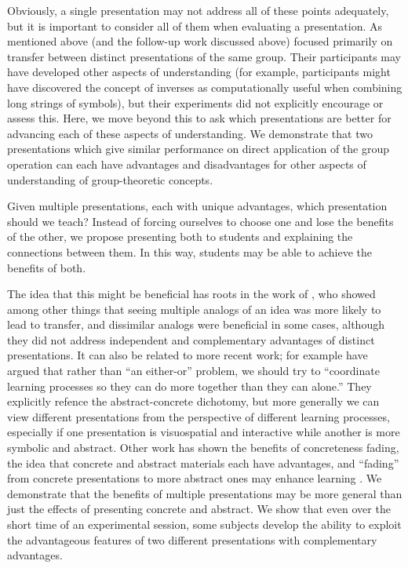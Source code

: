 \documentclass[man,mask,10pt]{apa6}
\begin{document}
Obviously, a single presentation may not address all of these points adequately, but it is important to consider all of them when evaluating a presentation. As mentioned above  (and the follow-up work discussed above) focused primarily on transfer between distinct presentations of the same group. Their participants may have developed other aspects of understanding (for example, participants might have discovered the concept of inverses as computationally useful when combining long strings of symbols), but their experiments did not explicitly encourage or assess this. Here, we move beyond this to ask which presentations are better for advancing each of these aspects of understanding. We demonstrate that two presentations which give similar performance on direct application of the group operation can each have advantages and disadvantages for other aspects of understanding of group-theoretic concepts.\par
Given multiple presentations, each with unique advantages, which presentation should we teach? Instead of forcing ourselves to choose one and lose the benefits of the other, we propose presenting both to students and explaining the connections between them. In this way, students may be able to achieve the benefits of both.\par
The idea that this might be beneficial has roots in the work of , who showed among other things that seeing multiple analogs of an idea was more likely to lead to transfer, and dissimilar analogs were beneficial in some cases, although they did not address independent and complementary advantages of distinct presentations. It can also be related to more recent work; for example  have argued that rather than ``an either-or'' problem, we should try to ``coordinate learning processes so they can do more together than they can alone.'' They explicitly refence the abstract-concrete dichotomy, but more generally we can view different presentations from the perspective of different learning processes, especially if one presentation is visuospatial and interactive while another is more symbolic and abstract. Other work has shown the benefits of concreteness fading, the idea that concrete and abstract materials each have advantages, and ``fading'' from concrete presentations to more abstract ones may enhance learning \cite{Fyfe2014}. We demonstrate that the benefits of multiple presentations may be more general than just the effects of presenting concrete and abstract. We show that even over the short time of an experimental session, some subjects develop the ability to exploit the advantageous features of two different presentations with complementary advantages.  \par
\end{document}
